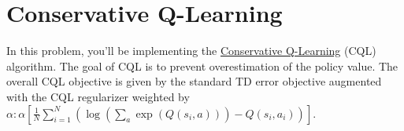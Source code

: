 \section{Conservative Q-Learning}

In this problem, you'll be implementing the \href{https://arxiv.org/abs/2006.04779}{Conservative Q-Learning} (CQL) algorithm. The goal of CQL is to prevent overestimation of the policy value. The overall CQL objective is given by the standard TD error objective augmented with the CQL regularizer weighted by $\alpha: \alpha\left[\frac{1}{N} \sum_{i=1}^N\left(\log \left(\sum_a \exp \left(Q\left(s_i, a\right)\right)\right)-Q\left(s_i, a_i\right)\right)\right]$. 

\begin{enumerate}[(a)]

  

  

  

\end{enumerate}




